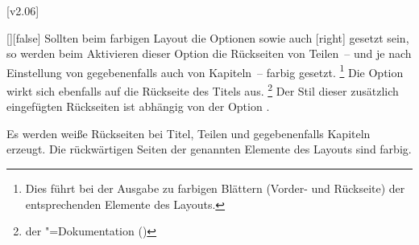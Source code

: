[v2.06]
\begin{Declaration}{[\PBoolean]}[false]%
\printdeclarationlist%
%
%
%
%
%
Sollten beim farbigen Layout die Optionen  sowie auch
[right] gesetzt sein, so werden beim Aktivieren dieser Option die 
Rückseiten von Teilen~-- und je nach Einstellung von  
gegebenenfalls auch von Kapiteln~-- farbig gesetzt.%
\footnote{%
  Dies führt bei der Ausgabe zu farbigen Blättern (Vorder- und Rückseite) der 
  entsprechenden Elemente des Layouts.
}
Die Option wirkt sich ebenfalls auf die Rückseite des Titels aus.%
\footnote{%
   der 
  \KOMAScript"=Dokumentation (\scrguide*)
}
Der Stil dieser zusätzlich eingefügten Rückseiten ist abhängig von der Option
.
%
\begin{values}
\itemfalse
  Es werden weiße Rückseiten bei Titel, Teilen und gegebenenfalls Kapiteln 
  erzeugt.
\itemtrue*
  Die rückwärtigen Seiten der genannten Elemente des Layouts sind farbig.
\end{values}
\end{Declaration}




